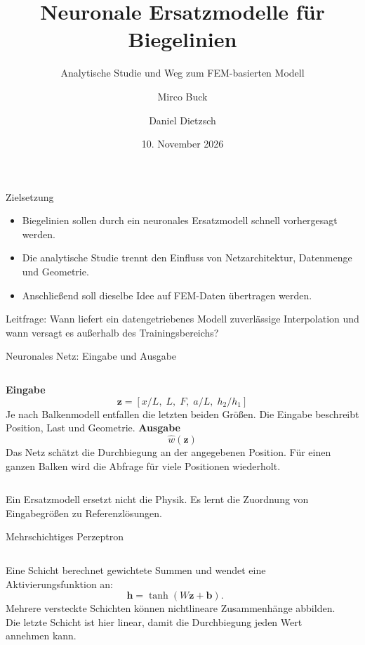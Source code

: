 \documentclass[aspectratio=169,10pt]{beamer}
\title{Neuronale Ersatzmodelle für Biegelinien}
\subtitle{Analytische Studie und Weg zum FEM-basierten Modell}
\author{Mirco Buck \and Daniel Dietzsch}
\institute{Universität Ulm}
\date{10. November 2026}
\begin{document}
\begin{frame}\titlepage\end{frame}

\begin{frame}{Zielsetzung}
\begin{itemize}
  \item Biegelinien sollen durch ein neuronales Ersatzmodell schnell vorhergesagt werden.
  \item Die analytische Studie trennt den Einfluss von Netzarchitektur, Datenmenge und Geometrie.
  \item Anschließend soll dieselbe Idee auf FEM-Daten übertragen werden.
\end{itemize}
\vfill
Leitfrage: Wann liefert ein datengetriebenes Modell zuverlässige Interpolation und wann versagt es außerhalb des Trainingsbereichs?
\end{frame}

\begin{frame}{Neuronales Netz: Eingabe und Ausgabe}
\begin{columns}[T]
\textbf{Eingabe}
\[
\boldsymbol{z}=\left[x/L,\; L,\; F,\; a/L,\; h_2/h_1\right]
\]
Je nach Balkenmodell entfallen die letzten beiden Größen. Die Eingabe beschreibt Position, Last und Geometrie.
\textbf{Ausgabe}
\[
\widehat w(\boldsymbol{z})
\]
Das Netz schätzt die Durchbiegung an der angegebenen Position. Für einen ganzen Balken wird die Abfrage für viele Positionen wiederholt.
\end{columns}
\vfill
Ein Ersatzmodell ersetzt nicht die Physik. Es lernt die Zuordnung von Eingabegrößen zu Referenzlösungen.
\end{frame}

\begin{frame}{Mehrschichtiges Perzeptron}
\begin{columns}[T]
Eine Schicht berechnet gewichtete Summen und wendet eine Aktivierungsfunktion an:
\[
\boldsymbol{h}=\tanh\!\left(W\boldsymbol{z}+\boldsymbol{b}\right).
\]
Mehrere versteckte Schichten können nichtlineare Zusammenhänge abbilden. Die letzte Schicht ist hier linear, damit die Durchbiegung jeden Wert annehmen kann.
\begin{center}
\end{center}
\end{columns}
\end{frame}
\end{document}
